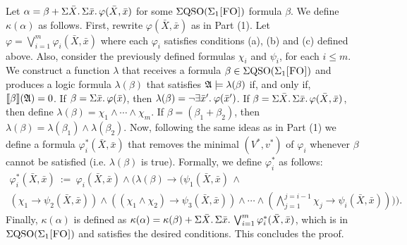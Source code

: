  Let $\alpha = \beta + \Sigma{\bar{X}}.\,\Sigma{\bar{x}}.\, \varphi(\bar{X},\bar{x})$ for some $\Sigma{\rm QSO}(\Sigma_{1}\textsc{[FO]})$ formula $\beta$. We define $\kappa(\alpha)$ as follows.
First, rewrite $\varphi(\bar{X},\bar{x})$ as in Part (1). Let $\varphi = \bigvee_{i = 1}^m\varphi_i(\bar{X},\bar{x})$ where each $\varphi_i$ satisfies conditions (a), (b) and (c) defined above. Also, consider the previously defined formulas $\chi_i$ and $\psi_i$, for each $i \leq m$. 
We construct a function $\lambda$ that receives a formula $\beta \in \Sigma{\rm QSO}(\Sigma_{1}\textsc{[FO]})$ and produces a logic formula $\lambda(\beta)$ that satisfies $\mathfrak{A}\models\lambda(\beta)$ if, and only if, ${\llbracket{}{\beta}\rrbracket}(\mathfrak{A}) = 0$. If $\beta = \Sigma{\bar{x}}.\, \varphi(\bar{x})$, then $\lambda(\beta) = \neg \exists{\bar{x}'}.\: \varphi(\bar{x}')$. If $\beta = \Sigma{\bar{X}}.\,\Sigma{\bar{x}}.\,\varphi(\bar{X},\bar{x})$, then 
define $\lambda(\beta) = \chi_1\wedge \cdots\wedge\chi_m$. If $\beta = (\beta_1 + \beta_2)$, then $\lambda(\beta) = \lambda(\beta_1) \wedge \lambda(\beta_2)$.
Now, following the same ideas as in Part (1) we define a formula $\varphi_i^*(\bar{X},\bar{x})$ that removes the minimal $(V^*, v^*)$ of $\varphi_i$ whenever $\beta$ cannot be satisfied (i.e. $\lambda(\beta)$ is true). Formally, we define $\varphi_i^*$ as follows:
\begin{multline*}
\varphi_i^*(\bar{X},\bar{x}) \ := \ \varphi_i(\bar{X},\bar{x})\wedge\Big(\lambda(\beta)\to\Big(\psi_1(\bar{X},\bar{x})\,\wedge \\
(\chi_1\to\psi_2(\bar{X},\bar{x}))\wedge((\chi_1\wedge\chi_2)\to\psi_3(\bar{X},\bar{x}))\wedge\cdots\wedge(
\bigwedge_{j = 1}^{j = i-1}\chi_j\to\psi_i(\bar{X},\bar{x}))\Big)\Big).
\end{multline*}
Finally, $\kappa(\alpha)$ is defined as $\kappa(\alpha) = \kappa(\beta) + \Sigma{\bar{X}}.\,\Sigma{\bar{x}}.\, \bigvee_{i = 1}^m\varphi_i^*(\bar{X},\bar{x})$, which is in $\Sigma{\rm QSO}(\Sigma_{1}\textsc{[FO]})$ and satisfies the desired conditions. This concludes the proof.
